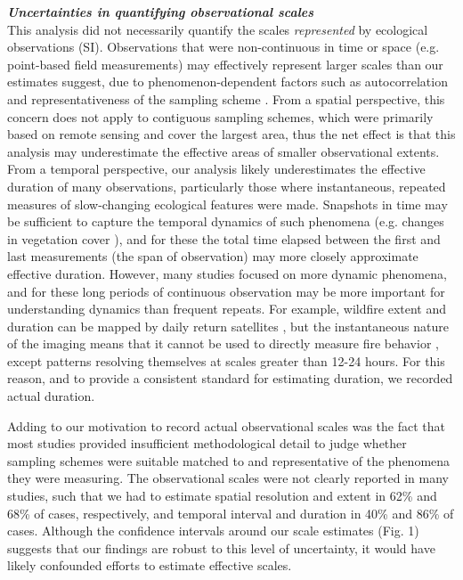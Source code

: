 \documentclass[12pt]{article}
\begin{document}
\noindent \textbf{\emph{Uncertainties in quantifying observational scales}}\\
This analysis did not necessarily quantify the scales \emph{represented} by ecological observations (SI). Observations that were non-continuous in time or space (e.g. point-based field measurements) may effectively represent larger scales than our estimates suggest, due to phenomenon-dependent factors such as autocorrelation and representativeness of the sampling scheme \cite{underwood_experiments_1997, palmer_scale_1994,cao_comparison_2002, legendre_spatial_1993,collins_method_2000-1}. From a spatial perspective, this concern does not apply to contiguous sampling schemes, which were primarily based on remote sensing and cover the largest area, thus the net effect is that this analysis may underestimate the effective areas of smaller observational extents. From a temporal perspective, our analysis likely underestimates the effective duration of many observations, particularly those where instantaneous, repeated measures of slow-changing ecological features were made. Snapshots in time may be sufficient to capture the temporal dynamics of such phenomena (e.g. changes in vegetation cover \cite{hansen_high-resolution_2013}), and for these the total time elapsed between the first and last measurements (the span of observation) may more closely approximate effective duration. However, many studies focused on more dynamic phenomena, and for these long periods of continuous observation may be more important for understanding dynamics than frequent repeats. For example, wildfire extent and duration can be mapped by daily return satellites \cite{roy_prototyping_2005,jones_fire_2009}, but the instantaneous nature of the imaging means that it cannot be used to directly measure fire behavior \cite{clements_observing_2007}, except patterns resolving themselves at scales greater than 12-24 hours. For this reason, and to provide a consistent standard for estimating duration, we recorded actual duration. 

Adding to our motivation to record actual observational scales was the fact that most studies provided insufficient methodological detail to judge whether sampling schemes were suitable matched to and representative of the phenomena they were measuring. The observational scales were not clearly reported in many studies, such that we had to estimate spatial resolution and extent in 62\% and 68\% of cases, respectively, and temporal interval and duration in 40\% and 86\% of cases. Although the confidence intervals around our scale estimates (Fig. 1) suggests that our findings are robust to this level of uncertainty, it would have likely confounded efforts to estimate effective scales. 
\end{document}
